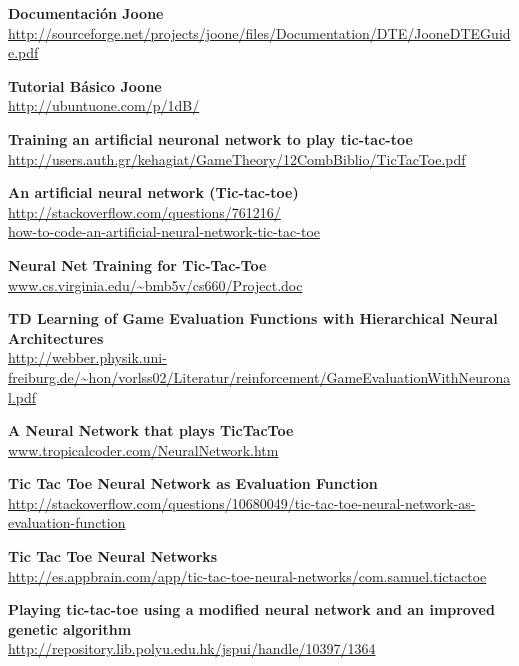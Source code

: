 \documentclass[12pt,titlepage]{article}
\begin{document}
\pagebreak
\begin{thebibliography}{99}
		\textbf{Documentaci\'on Joone} \\
		\url{http://sourceforge.net/projects/joone/files/Documentation/DTE/JooneDTEGuide.pdf}

		\textbf{Tutorial B\'asico Joone} \\
		\url{http://ubuntuone.com/p/1dB/}

		\textbf{Training an artificial neuronal network to play tic-tac-toe} \\
		\url{http://users.auth.gr/kehagiat/GameTheory/12CombBiblio/TicTacToe.pdf}

		\textbf{An artificial neural network (Tic-tac-toe)} \\
		\url{http://stackoverflow.com/questions/761216/} \\
		\url{how-to-code-an-artificial-neural-network-tic-tac-toe}

		\textbf{Neural Net Training for Tic-Tac-Toe} \\
		\url{www.cs.virginia.edu/~bmb5v/cs660/Project.doc}

		\textbf{TD Learning of Game Evaluation Functions with Hierarchical Neural Architectures} \\
		\url{http://webber.physik.uni-freiburg.de/~hon/vorlss02/Literatur/reinforcement/GameEvaluationWithNeuronal.pdf}

		\textbf{A Neural Network that plays TicTacToe} \\
		\url{www.tropicalcoder.com/NeuralNetwork.htm}    

		\textbf{Tic Tac Toe Neural Network as Evaluation Function} \\
		\url{http://stackoverflow.com/questions/10680049/tic-tac-toe-neural-network-as-evaluation-function}
	
		\textbf{Tic Tac Toe Neural Networks} \\
		\url{http://es.appbrain.com/app/tic-tac-toe-neural-networks/com.samuel.tictactoe}

		\textbf{Playing tic-tac-toe using a modified neural network and an improved genetic algorithm} \\
		\url{http://repository.lib.polyu.edu.hk/jspui/handle/10397/1364}


\end{thebibliography}
\end{document}
